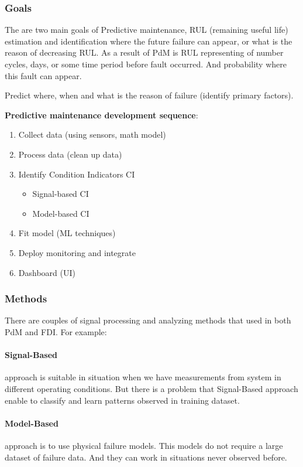 \documentclass[class=article, crop=false]{standalone}
\begin{document}
\subsubsection{Goals}
The are two main goals of Predictive maintenance, RUL (remaining useful
life) estimation and identification where the future failure can appear, or what is
the reason of decreasing RUL. 
As a result of PdM is RUL representing of number cycles, days, or some time
period before fault occurred. And probability where this fault can appear.

Predict where, when and what is the reason of failure (identify primary
factors).


\textbf{Predictive maintenance development sequence}:
\begin{enumerate}
    \item{Collect data (using sensors, math model)}
    \item{Process data (clean up data)}
    \item{Identify Condition Indicators CI}
        \begin{itemize}
            \item{Signal-based CI}
            \item{Model-based CI}
        \end{itemize}
    \item{Fit model (ML techniques)}
    \item{Deploy monitoring and integrate}
    \item{Dashboard (UI)}
\end{enumerate}


\subsubsection{Methods}
There are couples of signal processing and analyzing methods that used in
both PdM and FDI. For example:

\paragraph{Signal-Based} approach is suitable in situation when we have
measurements from system in different operating conditions. 
But there is a problem that Signal-Based approach enable to classify and
learn patterns observed in training dataset. 


\paragraph{Model-Based} approach is to use physical failure models. This
models do not require a large dataset of failure data. And they can work in
situations never observed before. 
\end{document}
